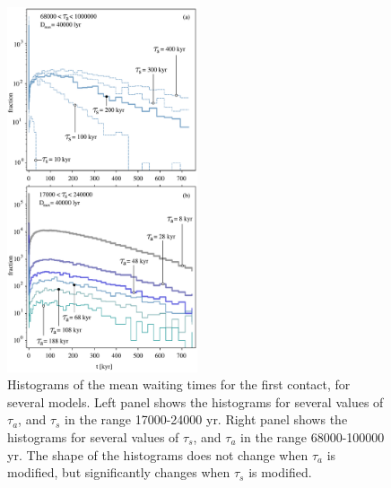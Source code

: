 \documentclass[crop]{CSLB}
\begin{document}
\begin{figure}
   \centering
   \includegraphics[width=0.5\textwidth]{F_waiting_for_1C.pdf}
   \caption{
Histograms of the mean waiting times for the first contact, for
several models.
%
Left panel shows the histograms for several values of $\tau_a$, and
$\tau_s$ in the range 17000-24000 yr.
%
Right panel shows the histograms for several values of $\tau_s$, and
$\tau_a$ in the range 68000-100000 yr.
%
The shape of the histograms does not change when $\tau_a$ is
modified, but significantly changes when $\tau_s$ is modified. 
%
   }
   \label{F_waiting_for_1C}
\end{figure}
\end{document}
